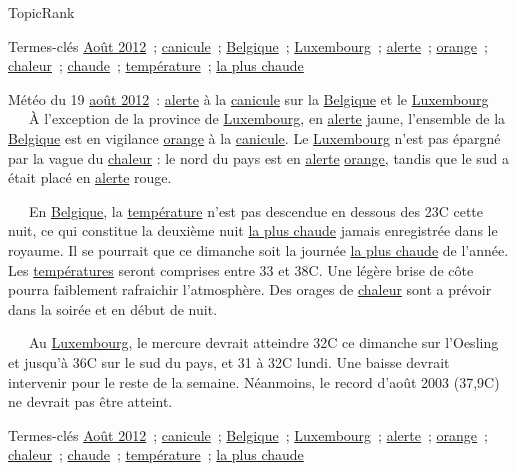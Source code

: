 \begin{frame}{TopicRank}
{\begin{exampleblock}
      \begin{exampleblock}{\small Termes-clés}\justifying\small
        \underline{Août 2012}~; \underline{canicule}~;
        \underline{Belgique}~; \underline{Luxembourg}~; \underline{alerte}~;
        \underline{orange}~; \underline{chaleur}~; \underline{chaude}~;
        \underline{température}~; \underline{la plus chaude}
      \end{exampleblock}
    \end{exampleblock}
  }{
    \begin{exampleblock}{\small
      Météo du 19 \underline{août 2012}~: \underline{alerte} à la
      \underline{canicule} sur la \underline{Belgique} et le
      \underline{Luxembourg}
    }\justifying\small
      ~~~À l'exception de la province de \underline{Luxembourg}, en
      \underline{alerte} jaune, l'ensemble de la \underline{Belgique} est en
      vigilance \underline{orange} à la \underline{canicule}. Le
      \underline{Luxembourg} n'est pas épargné par la vague du \underline{chaleur}
      : le nord du pays est en \underline{alerte} \underline{orange}, tandis que
      le sud a était placé en \underline{alerte} rouge.

      ~~~En \underline{Belgique}, la \underline{température} n'est pas descendue
      en dessous des 23\degre{}C cette nuit, ce qui constitue la deuxième nuit
      \underline{la plus chaude} jamais enregistrée dans le royaume. Il se
      pourrait que ce dimanche soit la journée \underline{la plus chaude} de
      l'année. Les \underline{températures} seront comprises entre 33 et
      38\degre{}C. Une légère brise de côte pourra faiblement rafraichir
      l'atmosphère. Des orages de \underline{chaleur} sont a prévoir dans la
      soirée et en début de nuit.

      ~~~Au \underline{Luxembourg}, le mercure devrait atteindre 32\degre{}C ce
      dimanche sur l'Oesling et jusqu'à 36\degre{}C sur le sud du pays, et 31 à
      32\degre{}C lundi. Une baisse devrait intervenir pour le reste de la
      semaine. Néanmoins, le record d'août 2003 (37,9\degre{}C) ne devrait pas
      être atteint.

      \begin{exampleblock}{\small Termes-clés}\justifying\small
        \underline{Août 2012}~; \underline{canicule}~;
        \underline{Belgique}~; \underline{Luxembourg}~; \underline{alerte}~;
        \underline{orange}~; \underline{chaleur}~; \underline{chaude}~;
        \underline{température}~; \underline{la plus chaude}
      \end{exampleblock}
    \end{exampleblock}
  }
\end{frame}


